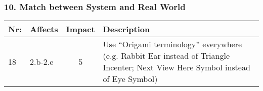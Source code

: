 \subsubsection*{10. Match between System and Real World}
        \begin{tabular}{l | p{} | c | p{}}
        Nr: & Affects & Impact & Description \\ \hline
        18 & 2.b-2.e & 5 & Use ``Origami terminology'' everywhere (e.g. Rabbit Ear instead of Triangle Incenter; Next View Here Symbol instead of Eye Symbol)\\ \hline 
        \end{tabular}
